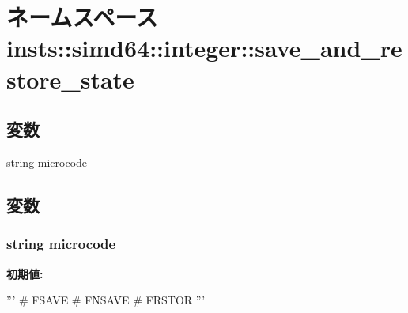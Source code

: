 \hypertarget{namespaceinsts_1_1simd64_1_1integer_1_1save__and__restore__state}{
\section{ネームスペース insts::simd64::integer::save\_\-and\_\-restore\_\-state}
\label{namespaceinsts_1_1simd64_1_1integer_1_1save__and__restore__state}
}
\subsection*{変数}
\begin{DoxyCompactItemize}
\item 
string \hyperlink{namespaceinsts_1_1simd64_1_1integer_1_1save__and__restore__state_a770f11a173e99389a8802f0107ed8f52}{microcode}
\end{DoxyCompactItemize}


\subsection{変数}
\hypertarget{namespaceinsts_1_1simd64_1_1integer_1_1save__and__restore__state_a770f11a173e99389a8802f0107ed8f52}{
\subsubsection[{microcode}]{\setlength{\rightskip}{0pt plus 5cm}string {\bf microcode}}}
\label{namespaceinsts_1_1simd64_1_1integer_1_1save__and__restore__state_a770f11a173e99389a8802f0107ed8f52}
{\bfseries 初期値:}
\begin{DoxyCode}
'''
# FSAVE
# FNSAVE
# FRSTOR
'''
\end{DoxyCode}
